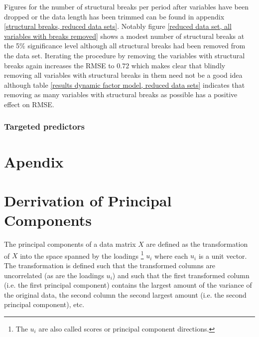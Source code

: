 \documentclass[11pt]{article}
\begin{document}
Figures for the number of structural breaks per period after variables have been dropped or the data length has been trimmed can be found in appendix \ref{structural breaks, reduced data sets}. Notably figure \ref{reduced data set, all variables with breaks removed} shows a modest number of structural breaks at the 5\% significance level although all structural breaks had been removed from the data set. Iterating the procedure by removing the variables with structural breaks again increases the RMSE to $0.72$ which makes clear that blindly removing all variables with structural breaks in them need not be a good idea although table \ref{results dynamic factor model, reduced data sets} indicates that removing as many variables with structural breaks as possible has a positive effect on RMSE.

\subsubsection{Targeted predictors}







\clearpage
\newpage
\appendix
\section*{Apendix}

\section{Derrivation of Principal Components}
\label{Derrivation of Principal Components}
The principal components of a data matrix $X$ are defined as the transformation of $X$ into the space spanned by the loadings \footnote{The $u_i$ are also called scores or principal component directions.} $u_i$ where each $u_i$ is a unit vector. The transformation is defined such that the transformed columns are uncorrelated (as are the loadings $u_i$) and such that the first transformed column (i.e. the first principal component) contains the largest amount of the variance of the original data, the second column the second largest amount (i.e. the second principal component), etc. \\
\end{document}
